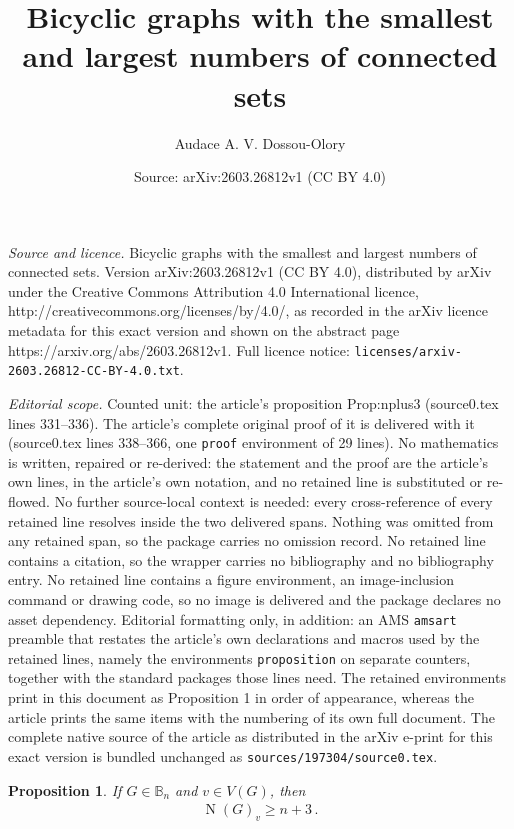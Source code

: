 \documentclass[10pt,a4paper]{amsart}
\title{Bicyclic graphs with the smallest and largest numbers of connected sets}
\author{Audace A. V. Dossou-Olory}
\date{Source: arXiv:2603.26812v1 (CC BY 4.0)}
\newtheorem{proposition}{Proposition}
\DeclareMathOperator{\N}{N}
\begin{document}
\maketitle

\noindent\emph{Source and licence.} Bicyclic graphs with the smallest and largest numbers of connected sets. Version arXiv:2603.26812v1 (CC BY 4.0), distributed by arXiv under the Creative Commons Attribution 4.0 International licence, http://creativecommons.org/licenses/by/4.0/, as recorded in the arXiv licence metadata for this exact version and shown on the abstract page https://arxiv.org/abs/2603.26812v1. Full licence notice: \texttt{licenses/arxiv-2603.26812-CC-BY-4.0.txt}.\par\smallskip

\noindent\textit{Editorial scope.} Counted unit: the article's proposition Prop:nplus3 (source0.tex lines 331--336). The article's complete original proof of it is delivered with it (source0.tex lines 338--366, one \texttt{proof} environment of 29 lines). No mathematics is written, repaired or re-derived: the statement and the proof are the article's own lines, in the article's own notation, and no retained line is substituted or re-flowed.  No further source-local context is needed: every cross-reference of every retained line resolves inside the two delivered spans.  Nothing was omitted from any retained span, so the package carries no omission record.  No retained line contains a citation, so the wrapper carries no bibliography and no bibliography entry.  No retained line contains a figure environment, an image-inclusion command or drawing code, so no image is delivered and the package declares no asset dependency.  Editorial formatting only, in addition: an AMS \texttt{amsart} preamble that restates the article's own declarations and macros used by the retained lines, namely the environments \texttt{proposition} on separate counters, together with the standard packages those lines need.  The retained environments print in this document as Proposition 1 in order of appearance, whereas the article prints the same items with the numbering of its own full document.  The complete native source of the article as distributed in the arXiv e-print for this exact version is bundled unchanged as \texttt{sources/197304/source0.tex}.
\begin{proposition}\label{Prop:nplus3}
If $G\in \mathbb{B}_n$ and $v\in V(G)$, then 
\begin{align*}
\N(G)_v \geq n+3\,.
\end{align*}
\end{proposition}
\end{document}
